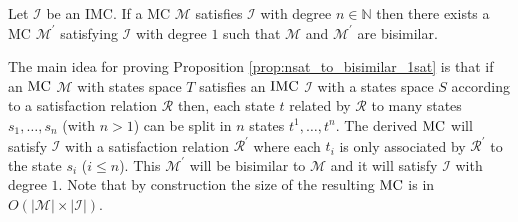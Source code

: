 \documentclass{llncs}
\makeatletter
\newcommand{\mc}{\textnormal{MC}}
\newcommand{\imc}{\textnormal{IMC}}
\newcommand{\satisfactionImc}{\ensuremath{\models^{a}_{\tt{I}}}}
\newcommand{\nsatisfaction}[3] {\ensuremath{#2 \oset[-0.5ex]{\text{\hspace*{0.02cm}\small{#1}}}{\satisfactionImc} #3}}
\newcommand{\Nset}             {\ensuremath{\mathbb{N}}}
\newcommand{\oset}[3][0ex]{%
  \mathrel{\mathop{#3}\limits^{
    \vbox to#1{\kern-2\ex@
    \hbox{$\scriptstyle#2$}\vss}}}}
\makeatother
\begin{document}
\begin{proposition}\label{prop:nsat_to_bisimilar_1sat}
	Let $\mathcal{I}$ be an \imc.
	If a {\mc} $\mathcal{M}$ satisfies $\mathcal{I}$ with degree $n \in \Nset$ 
	then there exists a {\mc} $\mathcal{M^\prime}$ satisfying $\mathcal{I}$ with degree $1$ 
	such that $\mathcal{M}$ and $\mathcal{M}^\prime$ are bisimilar.
\end{proposition}

The main idea for proving Proposition \ref{prop:nsat_to_bisimilar_1sat}
is that if an ${\mc}$ $\mathcal{M}$ with states space $T$ 
satisfies an ${\imc}$ $\mathcal{I}$ with a states space $S$
according to a satisfaction relation $\mathcal{R}$
then, each state $t$ related by $\mathcal{R}$ to many states $s_1, \ldots, s_n$ (with $n > 1$)
can be split in $n$ states $t^1, \ldots, t^n$.
The derived ${\mc}$ will satisfy $\mathcal{I}$ with a satisfaction relation $\mathcal{R}^\prime$
where each $t_i$ is only associated by $\mathcal{R}^\prime$ to the state $s_i$ ($i \leq n$).
This $\mathcal{M^\prime}$ will be bisimilar to $\mathcal{M}$ and 
it will satisfy $\mathcal{I}$ with degree $1$.
Note that by construction the size of the resulting ${\mc}$ is in $O(|\mathcal{M}|\times|\mathcal{I}|)$.
\end{document}
